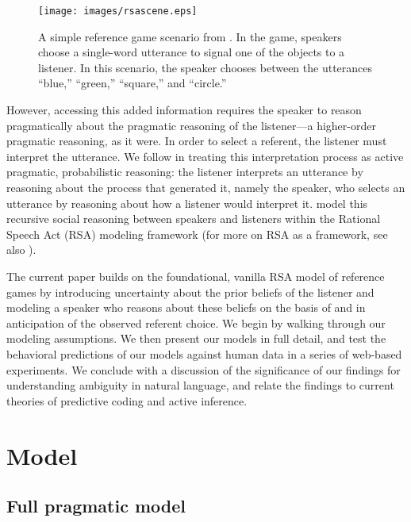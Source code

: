 \documentclass[10pt,a4paper]{article}
\begin{document}
\begin{figure}
	\centering
	\texttt{[image: images/rsascene.eps]}
	\caption{A simple reference game scenario from \protect{}. In the game, speakers choose a single-word utterance to signal one of the objects to a listener. In this scenario, the speaker chooses between the utterances ``blue,'' ``green,'' ``square,'' and ``circle.''}
	\label{FG-ref-game}
\end{figure}

However, accessing this added information requires the speaker to reason pragmatically about the pragmatic reasoning of the listener---a higher-order pragmatic reasoning, as it were. In order to select a referent, the listener must interpret the utterance. We follow  in treating this interpretation process as active pragmatic, probabilistic reasoning: the listener interprets an utterance by reasoning about the process that generated it, namely the speaker, who selects an utterance by reasoning about how a listener would interpret it. \citeauthor{frankgoodman2012} model this recursive social reasoning between speakers and listeners within the Rational Speech Act (RSA) modeling framework (for more on RSA as a framework, see also ).

The current paper builds on the foundational, vanilla RSA model of reference games by introducing uncertainty about the prior beliefs of the listener and modeling a speaker who reasons about these beliefs on the basis of and in anticipation of the observed referent choice. 
We begin by walking through our modeling assumptions. 
We then present our models in full detail, and test the behavioral predictions of our models against human data in a series of web-based experiments.
We conclude with a discussion of the significance of our findings for understanding ambiguity in natural language, and relate the findings to current theories of predictive coding and active inference.


\section{Model}
\subsection{Full pragmatic model}
\end{document}
